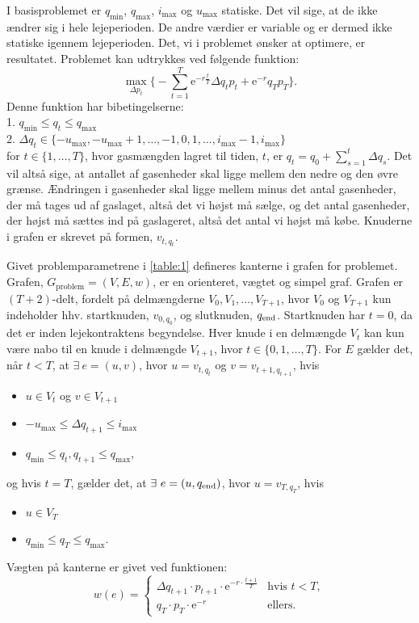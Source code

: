 I basisproblemet er $q_{\min}$, $q_{\max}$, $i_{\max}$ og $u_{\max}$ statiske. Det vil sige, at de ikke ændrer sig i hele lejeperioden. De andre værdier er variable og er dermed ikke statiske igennem lejeperioden. Det, vi i problemet ønsker at optimere, er resultatet. Problemet kan udtrykkes ved følgende funktion:
\begin{equation}
\max_{\Delta p_{t}} \Bigg\{ -\sum_{t=1}^{T} \mathrm{e}^{-r\frac{t}{T}} \Delta q_{t} p_{t}+ \mathrm{e}^{-r}q_{T}p_{T} \Bigg\}.
\end{equation}
Denne funktion har bibetingelserne:\\
1. $q_{\min} \leq q_{t} \leq q_{\max}$\\
2. $\Delta q_{t} \in \{-u_{\max},-u_{\max}+1,\dotsc,-1,0,1,\dotsc,i_{\max}-1,i_{\max} \}$ \\
for $t \in \{1,\dotsc,T\}$, hvor gasmængden lagret til tiden, $t$, er $q_{t}=q_{0}+\sum_{s=1}^{t} \Delta q_{s}$.
Det vil altså sige, at antallet af gasenheder skal ligge mellem den nedre og den øvre grænse. Ændringen i gasenheder skal ligge mellem minus det antal gasenheder, der må tages ud af gaslaget, altså det vi højst må sælge, og det antal gasenheder, der højst må sættes ind på gaslageret, altså det antal vi højst må købe.
Knuderne i grafen er skrevet på formen, $v_{t,q_t}$.

\begin{defn} [Problemgraf] \label{defn:graf_problem}
Givet problemparametrene i \autoref{table:1} defineres kanterne i grafen for problemet. Grafen, $G_{\textrm{problem}}=(V,E,w)$, er en orienteret, vægtet og simpel graf. Grafen er $(T+2)$-delt, fordelt på delmængderne $V_0,V_1, \dotsc, V_{T+1}$, hvor $V_0$ og $V_{T+1}$ kun indeholder hhv. startknuden, $v_{0,q_0}$, og slutknuden, $q_{\textrm{end}}$. Startknuden har $t=0$, da det er inden lejekontraktens begyndelse. Hver knude i en delmængde $V_{t}$ kan kun være nabo til en knude i delmængde $V_{t+1}$, hvor $t \in \{0,1, \dotsc,T\}$.
For $E$ gælder det, når $t<T$, at $\exists \ e = (u,v)$, hvor $u=v_{t,q_t}$ og $v=v_{t+1, q_{t+1}}$, hvis
	\begin{itemize}
	\item $u \in V_t$ og $v \in V_{t+1}$
	\item $-u_{\max} \leq \Delta q_{t+1} \leq i_{\max}$
	\item $q_{\min} \leq q_t, q_{t+1} \leq q_{\max}$,
	\end{itemize}
og hvis $t=T$, gælder det, at $\exists \ e=(u,q_{\slut})$, hvor $u=v_{T,q_T}$, hvis
	\begin{itemize}
	\item $u \in V_T$
	\item $q_{\min} \leq q_{T} \leq q_{\max}$.
	\end{itemize}
Vægten på kanterne er givet ved funktionen:
\begin{equation}
w(e)=
	\begin{cases}
	\Delta q_{t+1} \cdot p_{t+1} \cdot \textrm{e}^{-r \cdot \frac{t+1}{T}} &\text{hvis } t < T, \\
	q_T \cdot p_T \cdot \textrm{e}^{-r} & \text{ellers.}
	\end{cases}
\end{equation}

\end{defn}
